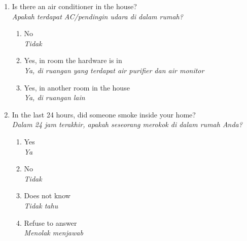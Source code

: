 \documentclass[reqno,12pt,notitlepage]{article}
\begin{document}
\begin{enumerate}
    \begin{enumerate}
        \item Good (green) \\ \textit{Baik (hijau)}
        \item Moderate (yellow) \\ \textit{Sedang (kuning)}
        \item Unhealthy for sensitive groups (orange) \\ \textit{Tidak sehat untuk kelompok rentan (oranye)}
        \item Unhealthy (red) \\ \textit{Tidak sehat (merah)}
        \item Very unhealthy (purple) \\ \textit{Sangat tidak sehat (ungu)}
        \item Hazardous (Brown) \\ \textit{Berbahaya (coklat)}
        \item Doesn't know \\ \textit{Tidak tahu}
    \end{enumerate}
    \item Is there an air conditioner in the house? \\ \textit{Apakah terdapat AC/pendingin udara di dalam rumah?}
    \begin{enumerate}
        \item No \\ \textit{Tidak}
        \item Yes, in room the hardware is in \\ \textit{Ya, di ruangan yang terdapat air purifier dan air monitor}
        \item Yes, in another room in the house \\ \textit{Ya, di ruangan lain}
    \end{enumerate}
    \item In the last 24 hours, did someone smoke inside your home?	\\ \textit{Dalam 24 jam terakhir, apakah seseorang merokok di dalam rumah Anda?}
    \begin{enumerate}
        \item Yes \\ \textit{Ya}
        \item No \\ \textit{Tidak}
         \item Does not know \\ \textit{Tidak tahu}
        \item Refuse to answer \\ \textit{Menolak menjawab}

\end{enumerate}
\end{enumerate}
\end{document}
